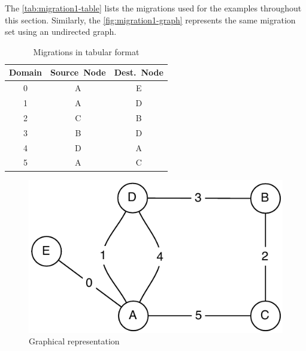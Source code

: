 The \autoref{tab:migration1-table} lists the migrations used for the examples throughout this section. Similarly, the \autoref{fig:migration1-graph} represents the same migration set using an undirected graph.

\begin{minipage}{0.45\textwidth}
	\begin{flushleft}
		\begin{table}[H]
		\begin{tabularx}{\textwidth}{ C C C }

		\toprule
		Domain & Source~Node &  Dest.~Node \\
		\hline

		0 & A & E \\
		1 & A & D \\
		2 & C & B \\
		3 & B & D \\
		4 & D & A \\
		5 & A & C \\
		\bottomrule
		\end{tabularx}

		\caption{Migrations in tabular format}
		\label{tab:migration1-table}
		\end{table}
	\end{flushleft}
\end{minipage}
\hfill
\begin{minipage}{0.45\textwidth}
	\begin{flushright}
		\begin{figure}[H]
			\centering
			\includegraphics[width=1\textwidth]{figures/migration-example-1}
			\vspace*{-1.5mm}
			\caption{Graphical representation}
			\label{fig:migration1-graph}
		\end{figure}
	\end{flushright}
\end{minipage}

